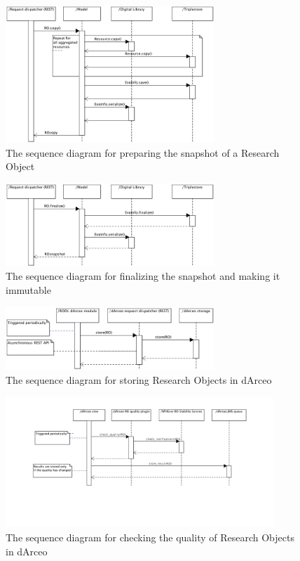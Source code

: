 \begin{figure}[!hb]
\centering
\includegraphics[width=0.7\textwidth]{Figures/RODL/SnapshotPerform.png}
\caption{The sequence diagram for preparing the snapshot of a Research Object}
\label{SnapshotPerform}
\end{figure}

\begin{figure}[!hb]
\centering
\includegraphics[width=0.7\textwidth]{Figures/RODL/SnapshotFinalize.png}
\caption{The sequence diagram for finalizing the snapshot and making it immutable}
\label{SnapshotFinalize}
\end{figure}

\begin{figure}[!hb]
\centering
\includegraphics[width=0.7\textwidth]{Figures/RODL/dArceoStore.png}
\caption{The sequence diagram for storing Research Objects in dArceo}
\label{dArceoStore}
\end{figure}

\begin{figure}[!hb]
\centering
\includegraphics[width=0.9\textwidth]{Figures/RODL/dArceoQuality.png}
\caption{The sequence diagram for checking the quality of Research Objects in dArceo}
\label{dArceoQuality}
\end{figure}

